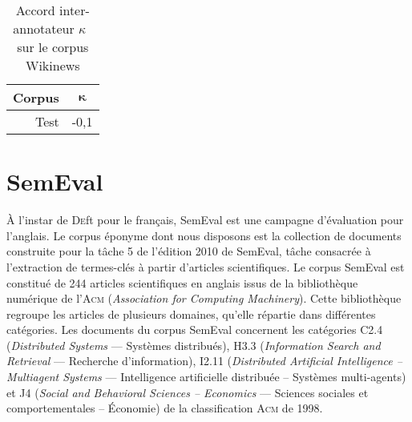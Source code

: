     \begin{table}[!h]
      \centering
      \begin{tabular}{r|c}
        \toprule
        \textbf{Corpus} & $\boldsymbol{\kappa}$\\
        \hline
        Test & -0,1\\
        \bottomrule
      \end{tabular}

      \caption{Accord inter-annotateur $\kappa$~\cite{fleiss1971kappa} sur le
               corpus Wikinews
               \label{tab:wikinews_kappa}}
    \end{table}


  \section[SemEval]{SemEval~\textnormal{\large\cite{kim2010semeval}}}
  \label{sec:main-data_description-semeval_data}
    À l'instar de \textsc{De}ft pour le français, SemEval est une campagne
    d'évaluation pour l'anglais. Le corpus éponyme dont nous disposons est la
    collection de documents construite pour la tâche 5 de l'édition 2010 de
    SemEval, tâche consacrée à l'extraction de termes-clés à partir d'articles
    scientifiques. Le corpus SemEval est constitué de 244 articles scientifiques
    en anglais issus de la bibliothèque numérique de l'\textsc{Acm}
    (\textit{Association for Computing Machinery}). Cette bibliothèque regroupe
    les articles de plusieurs domaines, qu'elle répartie dans différentes
    catégories. Les documents du corpus SemEval concernent les catégories C2.4
    (\textit{Distributed Systems} --- Systèmes distribués), H3.3
    (\textit{Information Search and Retrieval} --- Recherche d'information),
    I2.11 (\textit{Distributed Artificial Intelligence -- Multiagent Systems}
    --- Intelligence artificielle distribuée -- Systèmes multi-agents) et J4
    (\textit{Social and Behavioral Sciences -- Economics} --- Sciences sociales
    et comportementales -- Économie) de la classification \textsc{Acm} de 1998.
    
